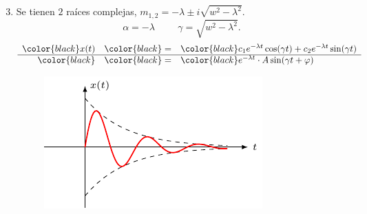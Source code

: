 \documentclass{beamer}
\begin{document}
\begin{frame}[t]
	\begin{block}{}
		\begin{enumerate}
			\setcounter{enumi}{2}
		\item {} Se tienen \(2\) raíces complejas, \(m_{1,2} = - \lambda \pm i \sqrt{w^2- \lambda ^2}\).
			\[
				\alpha = - \lambda \hspace{1cm} \gamma = \sqrt{w^2-  \lambda ^2}.
			\]
				\color{red} \vspace{-5mm}
			\[
				\begin{array}{rcl}
					\color{black} x(t) & \color{black} = & \color{black} c_1e^{- \lambda t} \cos (\gamma t) +c_2e^{- \lambda t} \sin (\gamma t) \\ \hline
					\color{black} & \color{black} = & \color{black} e^{- \lambda t} \cdot A \sin (\gamma t+ \varphi)
				\end{array}
			\]
				\begin{figure}[hbtp!]
					\centering
					\includegraphics[width= 0.8 \linewidth]{IMAGENES/5/tikz.pdf}
				\end{figure}
		\end{enumerate}
	\end{block}
\end{frame}
\end{document}
